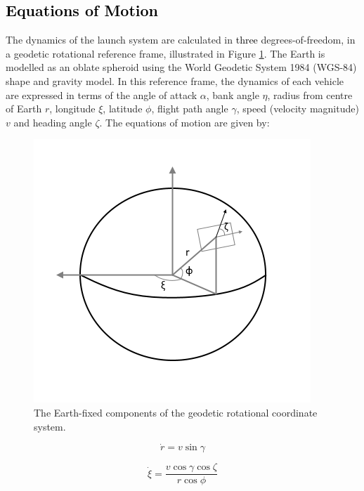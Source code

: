 \textcolor{black}{
\subsection{Equations of Motion}
}
\noindent
The dynamics of the launch system are calculated in \textcolor{black}{three} degrees-of-freedom, in a geodetic rotational reference frame, illustrated in Figure \ref{fig:global}. The Earth is modelled as an oblate spheroid using the World Geodetic System 1984\cite{Icao2002} (WGS-84) shape and gravity model. In this reference frame, the dynamics of each vehicle are expressed in terms of the angle of attack $\alpha$, bank angle $\eta$, radius from centre of Earth $r$, longitude $\xi$, latitude $\phi$, flight path angle $\gamma$, speed (velocity magnitude) $v$ and heading angle $\zeta$. The equations of motion are given by\cite{Maddock2017,Tewari2007}:
\begin{figure}[ht]
	\centering
	\includegraphics[width=0.7\linewidth]{figures/4_LODESTAR/global}
	\caption{The Earth-fixed components of the geodetic rotational coordinate system.}
	\label{fig:global}
\end{figure}


\begin{equation}
\dot{r} = v \sin \gamma
\end{equation}

\begin{equation}
\dot{\xi} = \frac{v\cos \gamma \cos \zeta}{r \cos \phi}
\end{equation}

